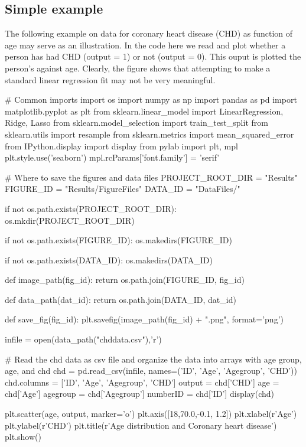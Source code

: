 \documentclass[%
oneside,                 %
final,                   %
10pt]{article}
\begin{document}
\subsection{Simple example}

The following example on data for coronary heart disease (CHD) as function of age may serve as an illustration. In the code here we read and plot whether a person has had CHD (output = 1) or not (output = 0). This ouput  is plotted the person's against age. Clearly, the figure shows that attempting to make a standard linear regression fit may not be very meaningful.

\bpycod
# Common imports
import os
import numpy as np
import pandas as pd
import matplotlib.pyplot as plt
from sklearn.linear_model import LinearRegression, Ridge, Lasso
from sklearn.model_selection import train_test_split
from sklearn.utils import resample
from sklearn.metrics import mean_squared_error
from IPython.display import display
from pylab import plt, mpl
plt.style.use('seaborn')
mpl.rcParams['font.family'] = 'serif'

# Where to save the figures and data files
PROJECT_ROOT_DIR = "Results"
FIGURE_ID = "Results/FigureFiles"
DATA_ID = "DataFiles/"

if not os.path.exists(PROJECT_ROOT_DIR):
    os.mkdir(PROJECT_ROOT_DIR)

if not os.path.exists(FIGURE_ID):
    os.makedirs(FIGURE_ID)

if not os.path.exists(DATA_ID):
    os.makedirs(DATA_ID)

def image_path(fig_id):
    return os.path.join(FIGURE_ID, fig_id)

def data_path(dat_id):
    return os.path.join(DATA_ID, dat_id)

def save_fig(fig_id):
    plt.savefig(image_path(fig_id) + ".png", format='png')

infile = open(data_path("chddata.csv"),'r')

# Read the chd data as  csv file and organize the data into arrays with age group, age, and chd
chd = pd.read_csv(infile, names=('ID', 'Age', 'Agegroup', 'CHD'))
chd.columns = ['ID', 'Age', 'Agegroup', 'CHD']
output = chd['CHD']
age = chd['Age']
agegroup = chd['Agegroup']
numberID  = chd['ID'] 
display(chd)

plt.scatter(age, output, marker='o')
plt.axis([18,70.0,-0.1, 1.2])
plt.xlabel(r'Age')
plt.ylabel(r'CHD')
plt.title(r'Age distribution and Coronary heart disease')
plt.show()
\epycod

\end{document}
